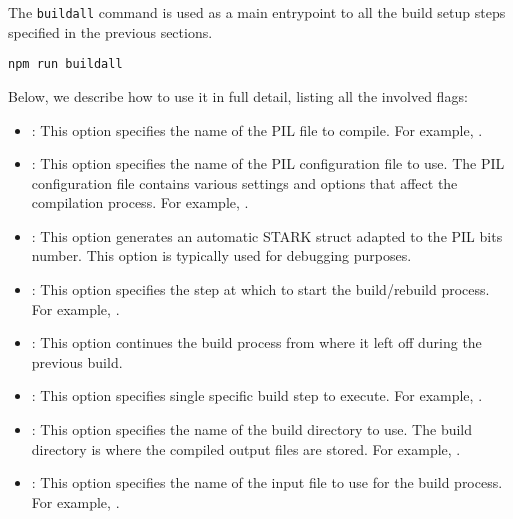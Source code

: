 The \texttt{buildall} command is used as a main entrypoint to all the build setup steps specified in the previous sections. 

\begin{lstlisting}[style=termt]
npm run buildall 
\end{lstlisting}

Below, we describe how to use it in full detail, listing all the involved flags:

\begin{itemize}

\item {}: This option specifies the name of the PIL file to compile. For example, .

\item {}: This option specifies the name of the PIL configuration file to use. The PIL configuration file contains various settings and options that affect the compilation process. For example, .

\item {}: This option generates an automatic STARK struct adapted to the PIL bits number. This option is typically used for debugging purposes. 

\item {}: This option specifies the step at which to start the build/rebuild process. For example, .

\item {}: This option continues the build process from where it left off during the previous build.

\item {}: This option specifies single specific build step to execute. For example, .

\item {}: This option specifies the name of the build directory to use. The build directory is where the compiled output files are stored. For example, .

\item {}: This option specifies the name of the input file to use for the build process. For example, .

\end{itemize}


